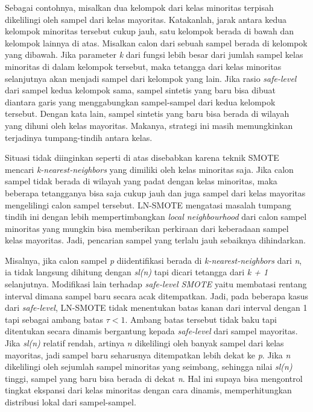Sebagai contohnya, misalkan dua kelompok dari kelas minoritas terpisah dikelilingi oleh sampel dari kelas mayoritas.
Katakanlah, jarak antara kedua kelompok minoritas tersebut cukup jauh, satu kelompok berada di bawah dan kelompok lainnya di atas.
Misalkan calon dari sebuah sampel berada di kelompok yang dibawah.
Jika parameter \textit{k} dari fungsi lebih besar dari jumlah sampel kelas minoritas di dalam kelompok tersebut, maka tetangga dari kelas minoritas selanjutnya akan menjadi sampel dari kelompok yang lain.
Jika rasio \textit{safe-level} dari sampel kedua kelompok sama, sampel sintetis yang baru bisa dibuat diantara garis yang menggabungkan sampel-sampel dari kedua kelompok tersebut.
Dengan kata lain, sampel sintetis yang baru bisa berada di wilayah yang dihuni oleh kelas mayoritas.
Makanya, strategi ini masih memungkinkan terjadinya tumpang-tindih antara kelas.

Situasi tidak diinginkan seperti di atas disebabkan karena teknik SMOTE mencari \textit{k-nearest-neighbors} yang dimiliki oleh kelas minoritas saja.
Jika calon sampel tidak berada di wilayah yang padat dengan kelas minoritas, maka beberapa tetangganya bisa saja cukup jauh dan juga sampel dari kelas mayoritas mengelilingi calon sampel tersebut.
LN-SMOTE mengatasi masalah tumpang tindih ini dengan lebih mempertimbangkan \textit{local neighbourhood} dari calon sampel minoritas yang mungkin bisa memberikan perkiraan dari keberadaan sampel kelas mayoritas.
Jadi, pencarian sampel yang terlalu jauh sebaiknya dihindarkan.

Misalnya, jika calon sampel \textit{p} diidentifikasi berada di \textit{k-nearest-neighbors} dari \textit{n}, ia tidak langsung dihitung dengan \textit{sl(n)} tapi dicari tetangga dari \textit{k + 1} selanjutnya.
Modifikasi lain terhadap \textit{safe-level SMOTE} yaitu membatasi rentang interval dimana sampel baru secara acak ditempatkan.
Jadi, pada beberapa kasus dari \textit{safe-level}, LN-SMOTE tidak menentukan batas kanan dari interval dengan 1 tapi sebagai ambang batas $\tau < 1$.
Ambang batas tersebut tidak baku tapi ditentukan secara dinamis bergantung kepada \textit{safe-level} dari sampel mayoritas.
Jika \textit{sl(n)} relatif rendah, artinya \textit{n} dikelilingi oleh banyak sampel dari kelas mayoritas, jadi sampel baru seharusnya ditempatkan lebih dekat ke \textit{p}.
Jika \textit{n} dikelilingi oleh sejumlah sampel minoritas yang seimbang, sehingga nilai \textit{sl(n)} tinggi, sampel yang baru bisa berada di dekat \textit{n}.
Hal ini supaya bisa mengontrol tingkat ekspansi dari kelas minoritas dengan cara dinamis, memperhitungkan distribusi lokal dari sampel-sampel.
